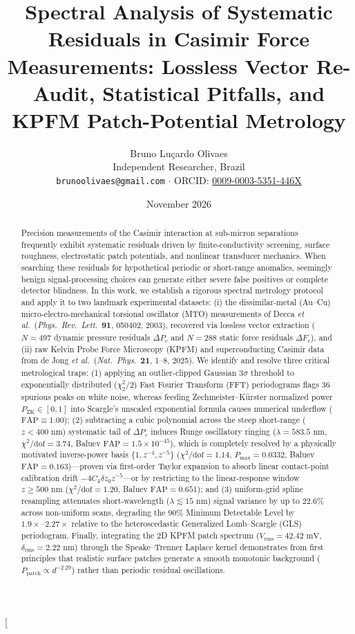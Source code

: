 \documentclass[10pt,twocolumn,a4paper]{article}
\title{\textbf{Spectral Analysis of Systematic Residuals in Casimir Force Measurements: Lossless Vector Re-Audit, Statistical Pitfalls, and KPFM Patch-Potential Metrology}}
\author{Bruno Lu\c{c}ardo Olivaes \\ \small Independent Researcher, Brazil \\ \small \texttt{brunoolivaes@gmail.com} $\cdot$ ORCID: \href{https://orcid.org/0009-0003-5351-446X}{0009-0003-5351-446X}}
\date{November 2026}
\begin{document}
\twocolumn[{%
  \begin{@twocolumnfalse}
    \maketitle
    \begin{abstract}
    \noindent Precision measurements of the Casimir interaction at sub-micron separations frequently exhibit systematic residuals driven by finite-conductivity screening, surface roughness, electrostatic patch potentials, and nonlinear transducer mechanics. When searching these residuals for hypothetical periodic or short-range anomalies, seemingly benign signal-processing choices can generate either severe false positives or complete detector blindness. In this work, we establish a rigorous spectral metrology protocol and apply it to two landmark experimental datasets: (i) the dissimilar-metal (Au--Cu) micro-electro-mechanical torsional oscillator (MTO) measurements of Decca \textit{et al.}\ (\textit{Phys.\ Rev.\ Lett.}\ \textbf{91}, 050402, 2003), recovered via lossless vector extraction ($N = 497$ dynamic pressure residuals $\Delta P_c$ and $N = 288$ static force residuals $\Delta F_c$), and (ii) raw Kelvin Probe Force Microscopy (KPFM) and superconducting Casimir data from de Jong \textit{et al.}\ (\textit{Nat.\ Phys.}\ \textbf{21}, 1--8, 2025). We identify and resolve three critical metrological traps: (1) applying an outlier-clipped Gaussian $3\sigma$ threshold to exponentially distributed ($\chi^2_2/2$) Fast Fourier Transform (FFT) periodograms flags $36$ spurious peaks on white noise, whereas feeding Zechmeister--K\"urster normalized power $P_{\mathrm{ZK}} \in [0,1]$ into Scargle's unscaled exponential formula causes numerical underflow ($\mathrm{FAP} \equiv 1.00$); (2) subtracting a cubic polynomial across the steep short-range ($z < 400\text{ nm}$) systematic tail of $\Delta P_c$ induces Runge oscillatory ringing ($\lambda = 583.5\text{ nm}$, $\chi^2/\mathrm{dof} = 3.74$, Baluev $\mathrm{FAP} = 1.5\times 10^{-45}$), which is completely resolved by a physically motivated inverse-power basis $\{1, z^{-4}, z^{-5}\}$ ($\chi^2/\mathrm{dof} = 1.14$, $P_{\max} = 0.0332$, Baluev $\mathrm{FAP} = 0.163$)---proven via first-order Taylor expansion to absorb linear contact-point calibration drift $-4 C_4 \delta z_0 z^{-5}$---or by restricting to the linear-response window $z \ge 500\text{ nm}$ ($\chi^2/\mathrm{dof} = 1.20$, Baluev $\mathrm{FAP} = 0.651$); and (3) uniform-grid spline resampling attenuates short-wavelength ($\lambda \lesssim 15\text{ nm}$) signal variance by up to $22.6\%$ across non-uniform scans, degrading the $90\%$ Minimum Detectable Level by $1.9\times\text{--}2.27\times$ relative to the heteroscedastic Generalized Lomb--Scargle (GLS) periodogram. Finally, integrating the 2D KPFM patch spectrum ($V_{\mathrm{rms}} = 42.42\text{ mV}$, $\delta_{\mathrm{rms}} = 2.22\text{ nm}$) through the Speake--Trenner Laplace kernel demonstrates from first principles that realistic surface patches generate a smooth monotonic background ($P_{\mathrm{patch}} \propto d^{-2.29}$) rather than periodic residual oscillations.

\end{abstract}
\end{@twocolumnfalse}}
\end{document}
